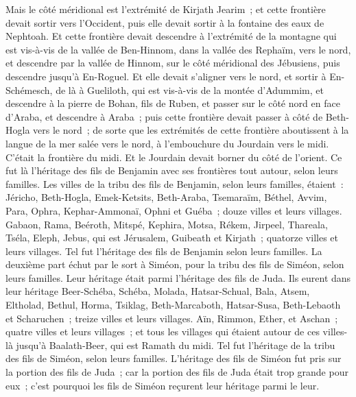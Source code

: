 \begin{multicols}{2}
Mais le côté méridional est l'extrémité de Kirjath Jearim~; et cette frontière devait sortir vers l'Occident, puis elle devait sortir à la fontaine des eaux de Nephtoah. 
Et cette frontière devait descendre à l'extrémité de la montagne qui est vis-à-vis de la vallée de Ben-Hinnom, dans la vallée des Rephaïm, vers le nord, et descendre par la vallée de Hinnom, sur le côté méridional des Jébusiens, puis descendre jusqu'à En-Roguel.
Et elle devait s'aligner vers le nord, et sortir à En-Schémesch, de là à Gueliloth, qui est vis-à-vis de la montée d'Adummim, et descendre à la pierre de Bohan, fils de Ruben,
et passer sur le côté nord en face d'Araba, et descendre à Araba~;
puis cette frontière devait passer à côté de Beth-Hogla vers le nord~; de sorte que les extrémités de cette frontière aboutissent à la langue de la mer salée vers le nord, à l'embouchure du Jourdain vers le midi. C'était la frontière du midi.
Et le Jourdain devait borner du côté de l'orient. Ce fut là l'héritage des fils de Benjamin avec ses frontières tout autour, selon leurs familles.
Les villes de la tribu des fils de Benjamin, selon leurs familles, étaient~: Jéricho, Beth-Hogla, Emek-Ketsits,
Beth-Araba, Tsemaraïm, Béthel,
Avvim, Para, Ophra,
Kephar-Ammonaï, Ophni et Guéba~; douze villes et leurs villages.
Gabaon, Rama, Beéroth,
Mitspé, Kephira, Motsa,
Rékem, Jirpeel, Thareala,
Tséla, Eleph, Jebus, qui est Jérusalem, Guibeath et Kirjath~; quatorze villes et leurs villages. Tel fut l'héritage des fils de Benjamin selon leurs familles.
\VerseOne{}La deuxième part échut par le sort à Siméon, pour la tribu des fils de Siméon, selon leurs familles. Leur héritage était parmi l'héritage des fils de Juda.
Ils eurent dans leur héritage Beer-Schéba, Schéba, Molada,
Hatsar-Schual, Bala, Atsem,
Eltholad, Bethul, Horma,
Tsiklag, Beth-Marcaboth, Hatsar-Susa,
Beth-Lebaoth et Scharuchen~; treize villes et leurs villages.
Aïn, Rimmon, Ether, et Aschan~; quatre villes et leurs villages~;
et tous les villages qui étaient autour de ces villes-là jusqu'à Baalath-Beer, qui est Ramath du midi. Tel fut l'héritage de la tribu des fils de Siméon, selon leurs familles.
L'héritage des fils de Siméon fut pris sur la portion des fils de Juda~; car la portion des fils de Juda était trop grande pour eux~; c'est pourquoi les fils de Siméon reçurent leur héritage parmi le leur.

\end{multicols}

